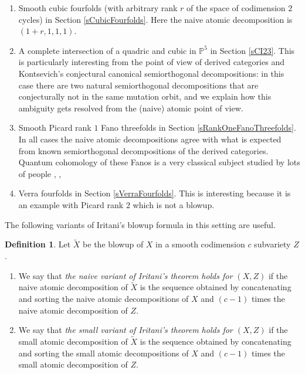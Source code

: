 \documentclass[11pt]{amsart}
\theoremstyle{plain}
\numberwithin{equation}{section}
\theoremstyle{definition}
\newtheorem{definition}[theorem]{Definition}
\theoremstyle{remark}
\begin{document}
\begin{enumerate}
\item 
Smooth cubic fourfolds (with arbitrary rank $r$ of the space of codimension $2$ cycles) in Section \ref{sCubicFourfolds}.
Here the naive atomic decomposition is $(1+r, 1, 1, 1)$.
\item 
A complete intersection of a quadric and cubic in $\mathbb{P}^5$ in Section \ref{sCI23}.  This is particularly interesting from the point of view of derived categories and Kontsevich's conjectural canonical semiorthogonal decompositions: in this case there are two natural semiorthogonal decompositions that are conjecturally not in the same mutation orbit, and we explain how this ambiguity gets resolved from the (naive) atomic point of view.
\item 
Smooth Picard rank $1$ Fano threefolds in 
Section \ref{sRankOneFanoThreefolds}. In all cases the naive atomic decompositions agree  with what is expected from  known semiorthogonal decompositions of the derived categories. Quantum cohomology of these Fanos is a very classical subject studied by lots of people \cite{Gol07}, \cite{Pr06},  \cite{Pr07a, Pr07b}
\item
Verra fourfolds in Section \ref{sVerraFourfolds}. This is interesting because it is an example with Picard rank $2$ which is not a blowup. 
\end{enumerate}

The following variants of Iritani's blowup formula \cite{Iritani23} in this setting are useful. %

\begin{definition}\label{dIritani}
Let $\widetilde{X}$ be the blowup of $X$ in a smooth codimension $c$ subvariety $Z$. 

\begin{enumerate}
\item
We say that \emph{the naive variant of Iritani's theorem holds for $(X, Z)$}  if the naive atomic decomposition of $\widetilde{X}$ is the sequence obtained by concatenating and sorting the naive atomic decompositions of $X$ and $(c-1)$ times the naive atomic decomposition of $Z$. 
\item 
We say that \emph{the small variant of Iritani's theorem holds for $(X, Z)$}  if the small atomic decomposition of $\widetilde{X}$ is the sequence obtained by concatenating and sorting the small atomic decompositions of $X$ and $(c-1)$ times the small  atomic decomposition of $Z$. 
\end{enumerate}

\end{definition}
\end{document}
